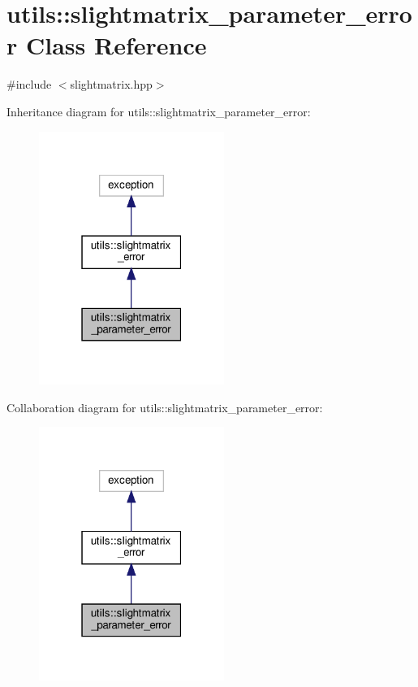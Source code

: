\hypertarget{classutils_1_1slightmatrix__parameter__error}{}\section{utils\+:\+:slightmatrix\+\_\+parameter\+\_\+error Class Reference}
\label{classutils_1_1slightmatrix__parameter__error}


{\ttfamily \#include $<$slightmatrix.\+hpp$>$}



Inheritance diagram for utils\+:\+:slightmatrix\+\_\+parameter\+\_\+error\+:
\nopagebreak
\begin{figure}[H]
\begin{center}
\leavevmode
\includegraphics[width=171pt]{classutils_1_1slightmatrix__parameter__error__inherit__graph}
\end{center}
\end{figure}


Collaboration diagram for utils\+:\+:slightmatrix\+\_\+parameter\+\_\+error\+:
\nopagebreak
\begin{figure}[H]
\begin{center}
\leavevmode
\includegraphics[width=171pt]{classutils_1_1slightmatrix__parameter__error__coll__graph}
\end{center}
\end{figure}


